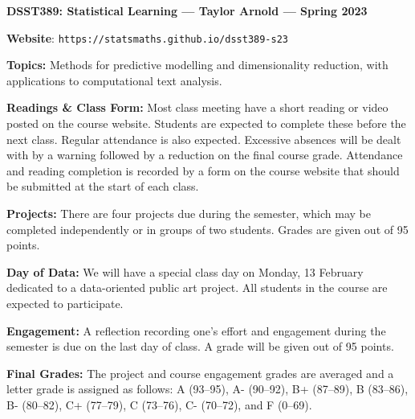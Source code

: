 \documentclass[11pt, a4paper]{article}
\begin{document}
\begin{center}
\textbf{DSST389: Statistical Learning --- Taylor Arnold --- Spring 2023}
\end{center}

\vspace{0.5cm}

\textbf{Website}: \texttt{https://statsmaths.github.io/dsst389-s23}

\bigskip

\textbf{Topics:}
Methods for predictive modelling and dimensionality reduction, with
applications to computational text analysis.

\bigskip

\textbf{Readings \& Class Form:}
Most class meeting have a short reading or video posted on the course
website. Students are expected to complete these before the next class.
Regular attendance is also expected. Excessive absences will be dealt
with by a warning followed by a reduction on the final course grade.
Attendance and reading completion is recorded by a form on the course
website that should be submitted at the start of each class.

\bigskip

\textbf{Projects:}
There are four projects due during the semester, which may be completed 
independently or in groups of two students. Grades are given out of 95
points.

\bigskip

\textbf{Day of Data:}
We will have a special class day on Monday, 13 February dedicated to a
data-oriented public art project. All students in the course are expected
to participate.

\bigskip

\textbf{Engagement:}
A reflection recording one's effort and engagement during the semester
is due on the last day of class. A grade will be given out of 95 points.

\bigskip

\textbf{Final Grades:}
The project and course engagement grades are averaged and a letter grade
is assigned as follows:
             A (93--95), A- (90--92),
B+ (87--89), B (83--86), B- (80--82),
C+ (77--79), C (73--76), C- (70--72), and F (0--69).
\end{document}
